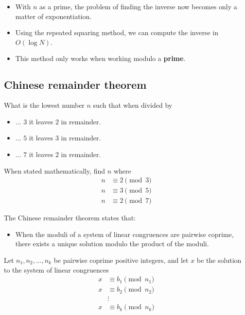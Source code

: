 \documentclass[12pt,t]{beamer}
\newcommand{\bi}{\begin{itemize}}
\newcommand{\ei}{\end{itemize}}
\begin{document}
\begin{frame}
  \vspace{40pt}
  \bi
    \item With $n$ as a prime, the problem of finding the inverse now becomes
      only a matter of exponentiation.
    \item Using the repeated squaring method, we can compute the inverse in $O(\log N)$.
    \item This method only works when working modulo a \textbf{prime}.
  \ei
\end{frame}

\subsection{Chinese remainder theorem}

\begin{frame}
  \vspace{20pt}
  What is the lowest number $n$ such that when divided by
  \vspace{10pt}
  \bi
    \item[] ... $3$ it leaves $2$ in remainder.
    \item[] ... $5$ it leaves $3$ in remainder.
    \item[] ... $7$ it leaves $2$ in remainder.
  \ei
  \vspace{10pt}
  When stated mathematically, find $n$ where
      \begin{align*}
  n &\equiv 2 \pmod{3} \\
  n &\equiv 3 \pmod{5} \\
  n &\equiv 2 \pmod{7}
      \end{align*}
\end{frame}

\begin{frame}
  \vspace{20pt}
  The Chinese remainder theorem states that:
  \bi
    \item When the moduli of a system of linear congruences are pairwise
      coprime, there exists a unique solution modulo the product of the moduli.
  \ei
  Let $n_1, n_2,\ldots, n_k$ be pairwise coprime positive integers, and let $x$
  be the solution to the system of linear congruences
  \begin{align*}
    x &\equiv  b_1 \pmod{n_1} \\
    x &\equiv  b_2 \pmod{n_2} \\
      &\vdots                 \\
    x &\equiv b_k \pmod{n_k}
  \end{align*}
\end{frame}
\end{document}
